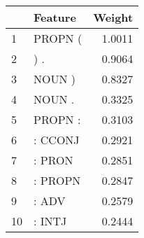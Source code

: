 \begin{tabular}{llr}
\toprule
{} &  Feature &  Weight \\
\midrule
1  &  PROPN ( &  1.0011 \\
2  &      ) . &  0.9064 \\
3  &   NOUN ) &  0.8327 \\
4  &   NOUN . &  0.3325 \\
5  &  PROPN : &  0.3103 \\
6  &  : CCONJ &  0.2921 \\
7  &   : PRON &  0.2851 \\
8  &  : PROPN &  0.2847 \\
9  &    : ADV &  0.2579 \\
10 &   : INTJ &  0.2444 \\
\bottomrule
\end{tabular}
